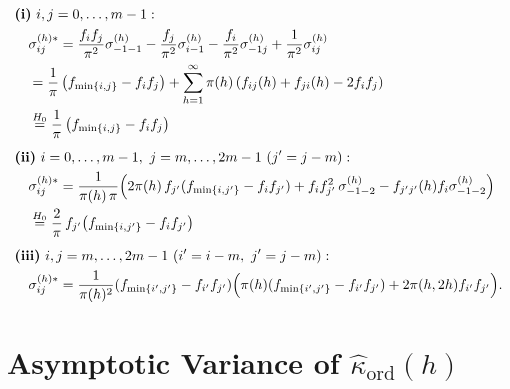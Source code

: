 ﻿\documentclass[12pt,a4paper]{scrreprt}
\theoremstyle{definition}
\begin{document}
\begin{appendices}
{\allowdisplaybreaks
\begin{align*}
    &\textbf{(i)}\ i,j = 0, \ldots, m-1: \\
    &\quad \sigma^{(h)*}_{ij}
    = \frac{f_i f_j}{\pi^2} \sigma^{(h)}_{-1-1} 
    - \frac{f_j}{\pi^2} \sigma^{(h)}_{i-1} 
    - \frac{f_i}{\pi^2} \sigma^{(h)}_{-1j} 
    + \frac{1}{\pi^2} \sigma^{(h)}_{ij} \\
    &\quad = \frac{1}{\pi}\left(f_{\min\{i,j\}} - f_i f_j\right) 
    + \sum_{h=1}^{\infty} \pi(h) \left(f_{ij}(h) + f_{ji}(h) - 2f_i f_j\right) \\
    &\quad \overset{H_0}{=} 
    \frac{1}{\pi} \left(f_{\min\{i,j\}} - f_i f_j\right) \\[1ex]
    &\textbf{(ii)}\ i = 0, \ldots, m-1,\ j = m, \ldots, 2m-1 
    \ (j' = j - m): \\
    &\quad \sigma^{(h)*}_{ij}
    = \frac{1}{\pi(h)\,\pi} \Bigl(
    2\pi(h)\,f_{j'}(f_{\min\{i,j'\}} - f_i f_{j'}) 
    + f_i f_{j'}^2\,\sigma^{(h)}_{-1-2} 
    - f_{j'j'}(h) f_i \sigma^{(h)}_{-1-2} \Bigr) \\
    &\quad \overset{H_0}{=} 
    \frac{2}{\pi}\,f_{j'}\!\left(f_{\min\{i,j'\}} - f_i f_{j'}\right) \\[1ex]
    &\textbf{(iii)}\ i,j = m, \ldots, 2m-1 
    \ (i' = i-m,\ j' = j-m): \\
    &\quad \sigma^{(h)*}_{ij}
    = \frac{1}{\pi(h)^2}(f_{\min\{i', j'\}}- f_{i'} f_{j'})
    \Bigl(\pi(h)(f_{\min\{i', j'\}}- f_{i'} f_{j'})  + 2\pi(h, 2h)f_{i'}f_{j'}\Bigr).
\end{align*}}

\section{Asymptotic Variance of $\hat{\kappa}_{\mathrm{ord}}(h)$}\label{app:var-kappa}


\end{appendices}
\end{document}
